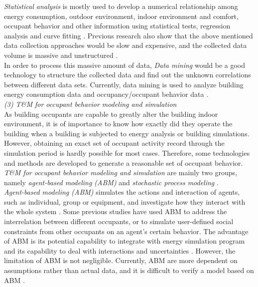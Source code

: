 \documentclass[a4paper, oneside]{discothesis}
\begin{document}
			\textit{Statistical analysis} is mostly used to develop a numerical relationship among energy consumption, outdoor environment, indoor environment and comfort, occupant behavior and other information using statistical tests, regression analysis and curve fitting \cite{ZOU2018165}. Previous research also show that the above mentioned data collection approaches would be slow and expensive, and the collected data volume is massive and unstructured \cite{liang2016occupancy}.\\

			In order to process this massive amount of data, \textit{Data mining} would be a good technology to structure the collected data and find out the unknown correlations between different data sets. Currently, data mining is used to analyze building energy consumption data and occupancy/occupant behavior data \cite{xiao2014data}.\\

			\textit{(3) T\&M for occupant behavior modeling and simulation}\\
			As building occupants are capable to greatly alter the building indoor environment, it is of importance to know how exactly did they operate the building when a building is subjected to energy analysis or building simulations. However, obtaining an exact set of occupant activity record through the simulation period is hardly possible for most cases. Therefore, some technologies and methods are developed to generate a reasonable set of occupant behavior. \textit{T\&M for occupant behavior modeling and simulation} are mainly two groups, namely \textit{agent-based modeling (ABM)} and \textit{stochastic process modeling} \cite{ZOU2018165}.\\

			\textit{Agent-based modeling (ABM)} simulates the actions and interaction of agents, such as individual, group or equipment, and investigate how they interact with the whole system \cite{jia2017occupancy}. Some previous studies have used ABM to address the interrelation between different occupants, or to simulate user-defined social constraints from other occupants on an agent's certain behavior. The advantage of ABM is its potential capability to integrate with energy simulation program and its capability to deal with interactions and uncertainties \cite{ZOU2018165}. However, the limitation of ABM is not negligible. Currently, ABM are more dependent on assumptions rather than actual data, and it is difficult to verify a model based on ABM \cite{ZOU2018165,jia2017occupancy}. \\
\end{document}
